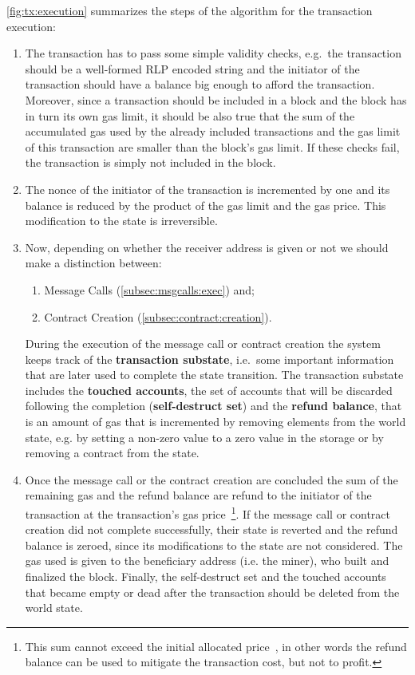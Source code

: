 \autoref{fig:tx:execution} summarizes the steps of the algorithm for the 
transaction execution:
\begin{enumerate}
	\item The transaction has to pass some simple validity checks, e.g.\ the
	transaction should be a well-formed RLP encoded string and the initiator
	of the transaction should have a balance big enough to afford the 
	transaction.
	Moreover, since a transaction should be included in a block and the block
	has in turn its own gas limit, it should be also true that the sum 
	of the accumulated gas used by the already included transactions and the gas
	limit of this transaction are smaller than the block's gas limit.
	If these checks fail, the transaction is simply not included in the block.
	
	
	\item The nonce of the initiator of the transaction is incremented by one and its balance is reduced by the product of the gas limit and the gas price. This modification to the state is irreversible.
	\item Now, depending on whether the receiver address is given or not
	we should make a distinction between:
	\begin{enumerate}[label=\alph*.]
		\item Message Calls (\autoref{subsec:msgcalls:exec}) and;
		\item Contract Creation (\autoref{subsec:contract:creation}).
	\end{enumerate}
	During the execution of the message call or contract creation the system
	keeps track of the \textbf{transaction substate}, i.e.\ some important
	information that are later used to complete the state transition.
	The transaction substate includes the \textbf{touched accounts}, the set of
	accounts that will be discarded following the completion 
	(\textbf{self-destruct set}) and the
	\textbf{refund balance}, that is an amount of gas that is incremented by
	removing elements from the world state, e.g. by setting a non-zero value to
	a zero value in the storage or by removing a contract from the state.
	
	\item Once the message call or the contract creation are concluded
	the sum of the remaining gas and the refund balance are refund
	to the initiator of the transaction at the transaction's gas price~\footnote{This sum cannot exceed the initial allocated
	price~\cite{wood2018ethereum}, in other words the refund balance can be 
	used to mitigate the transaction cost, but not to profit.}.
	If the message call or contract creation did not complete successfully,
	their state is reverted and the refund balance is zeroed, since its
	modifications to the state are not considered.
	The gas used is given to the beneficiary address (i.e. the miner), who
	built and finalized the block. Finally, the self-destruct set and the
	touched accounts that became empty or dead after the transaction should
	be deleted from the world  state.
\end{enumerate}
 

